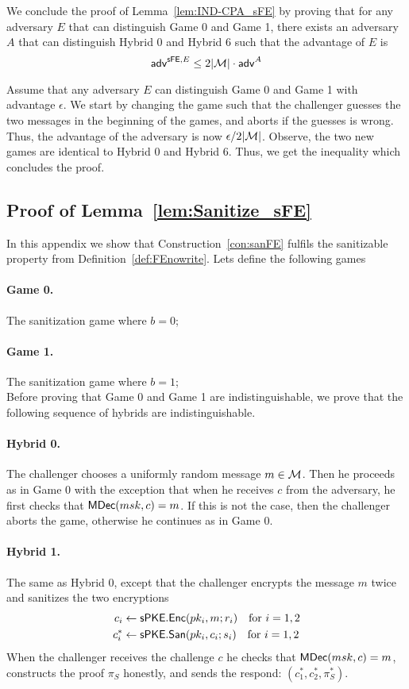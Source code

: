 \documentclass{llncs}
\begin{document}
We conclude the proof of Lemma~\ref{lem:IND-CPA_sFE} by proving that for any adversary $E$ that can distinguish Game 0 and Game 1, there exists an adversary $A$ that can distinguish Hybrid 0 and Hybrid 6 such that the advantage of $E$ is $$\mathsf{adv}^{\mathsf{sFE},E} \leq 2|\mathcal{M}| \cdot\mathsf{adv}^{A}$$

Assume that any adversary $E$ can distinguish Game 0 and Game 1 with advantage $\epsilon$. 
We start by changing the game such that the challenger guesses the two messages in the beginning of the games, and aborts if the guesses is wrong. Thus, the advantage of the adversary is now $\epsilon/2|\mathcal{M}|$.
Observe, the two new games are identical to Hybrid 0 and Hybrid 6. Thus, we get the inequality which concludes the proof.




\subsection{Proof of Lemma~\ref{lem:Sanitize_sFE}}\label{app:Sanitize_sFE}
\setcounter{claimcounter}{0}

In this appendix we show that Construction~\ref{con:sanFE} fulfils the sanitizable property from Definition~\ref{def:FEnowrite}.
Lets define the following games
\paragraph{Game 0.} The sanitization game where $b=0$;
\paragraph{Game 1.} The sanitization game where $b=1$; \\

Before proving that Game 0 and Game 1 are indistinguishable, we  prove that the following sequence of hybrids are indistinguishable. 

\paragraph{Hybrid 0.} The challenger chooses a uniformly random message $m \in \mathcal{M}$. Then he proceeds as in Game 0 with the exception that when he receives $c$ from the adversary, he first checks that $\mathsf{MDec}(msk,c) = m$. If this is not the case, then the challenger aborts the game, otherwise he continues as in Game 0.

\paragraph{Hybrid 1.} The same as Hybrid 0, except that the challenger encrypts the message $m$ twice and sanitizes the two encryptions
	\begin{align*}
	c_i &\leftarrow \mathsf{sPKE}.\mathsf{Enc}(pk_i,m;r_i) \quad \text{for } i = 1,2 \\
	c^*_i &\leftarrow \mathsf{sPKE}.\mathsf{San}(pk_i,c_i;s_i) \quad \text{for } i = 1,2 
	\end{align*}
	When the challenger receives the challenge $c$ he checks that $\mathsf{MDec}(msk,c) = m$, constructs the proof $\pi_S$ honestly, and sends the respond: $(c^*_1,c^*_2,\pi_S^*)$.
\end{document}
